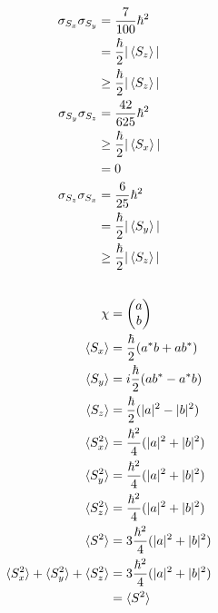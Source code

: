 \documentclass{article}
\begin{document}
\begin{enumerate}
        \begin{align*}
          \sigma_{S_x} \sigma_{S_y} & = \frac{7}{100} \hbar^2            \\
                                    & = \frac{\hbar}{2} |\braket{S_z}|   \\
                                    & \ge \frac{\hbar}{2} |\braket{S_z}| \\
          \sigma_{S_y} \sigma_{S_z} & = \frac{42}{625} \hbar^2           \\
                                    & \ge \frac{\hbar}{2} |\braket{S_x}| \\
                                    & = 0                                \\
          \sigma_{S_z} \sigma_{S_x} & = \frac{6}{25} \hbar^2             \\
                                    & = \frac{\hbar}{2} |\braket{S_y}|   \\
                                    & \ge \frac{\hbar}{2} |\braket{S_z}|
        \end{align*}
\end{enumerate}

\subsection{}

\begin{align*}
  \chi                                             & = \begin{pmatrix}
                                                         a \\
                                                         b
                                                       \end{pmatrix}                      \\
  \braket{S_x}                                     & = \frac{\hbar}{2} (a^* b + a b^*)     \\
  \braket{S_y}                                     & = i \frac{\hbar}{2} (a b^* - a^* b)   \\
  \braket{S_z}                                     & = \frac{\hbar}{2} (|a|^2 - |b|^2)     \\
  \braket{S_x^2}                                   & = \frac{\hbar^2}{4} (|a|^2 + |b|^2)   \\
  \braket{S_y^2}                                   & = \frac{\hbar^2}{4} (|a|^2 + |b|^2)   \\
  \braket{S_z^2}                                   & = \frac{\hbar^2}{4} (|a|^2 + |b|^2)   \\
  \braket{S^2}                                     & = 3 \frac{\hbar^2}{4} (|a|^2 + |b|^2) \\
  \braket{S_x^2} + \braket{S_y^2} + \braket{S_z^2} & = 3 \frac{\hbar^2}{4} (|a|^2 + |b|^2) \\
                                                   & = \braket{S^2}
\end{align*}
\end{document}
